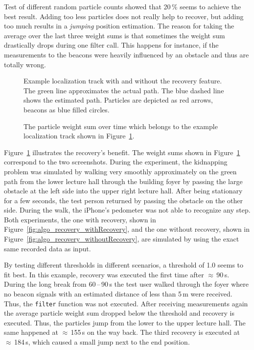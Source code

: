 Test of different random particle counts showed that 20\,\% seems to achieve the best result. Adding too less particles does not really help to recover, but adding too much results in a \emph{jumping} position estimation. The reason for taking the average over the last three weight sums is that sometimes the weight sum drastically drops during one filter call. This happens for instance, if the measurements to the beacons were heavily influenced by an obstacle and thus are totally wrong.

\begin{figure}
	
	\caption {Example localization track with and without the recovery feature. The green line approximates the actual path. The blue dashed line shows the estimated path. Particles are depicted as red arrows, beacons as blue filled circles.}
	\label{fig:algo_recoveryImg}
\end{figure}

\begin{figure}
	
	\caption {The particle weight sum over time which belongs to the example localization track shown in Figure~\ref{fig:algo_recoveryImg}.}
	\label{fig:algo_recovery}
\end{figure}

Figure~\ref{fig:algo_recoveryImg} illustrates the recovery's benefit. The weight sums shown in Figure~\ref{fig:algo_recoveryImg} correspond to the two screenshots. During the experiment, the kidnapping problem was simulated by walking very smoothly approximately on the green path from the lower lecture hall through the building foyer by passing the large obstacle at the left side into the upper right lecture hall. After being stationary for a few seconds, the test person returned by passing the obstacle on the other side. During the walk, the iPhone's pedometer was not able to recognize any step. Both experiments, the one with recovery, shown in Figure~\ref{fig:algo_recovery_withRecovery}, and the one without recovery, shown in Figure~\ref{fig:algo_recovery_withoutRecovery}, are simulated by using the exact same recorded data as input.

By testing different thresholds in different scenarios, a threshold of 1.0 seems to fit best. In this example, recovery was executed the first time after $\approx$\,90\,s. During the long break from 60\,--\,90\,s the test user walked through the foyer where no beacon signals with an estimated distance of less than 5\,m were received. Thus, the \texttt{filter} function was not executed. After receiving measurements again the average particle weight sum dropped below the threshold and recovery is executed. Thus, the particles jump from the lower to the upper lecture hall. The same happened at $\approx$\,155\,s on the way back. The third recovery is executed at $\approx$\,184\,s, which caused a small jump next to the end position.

